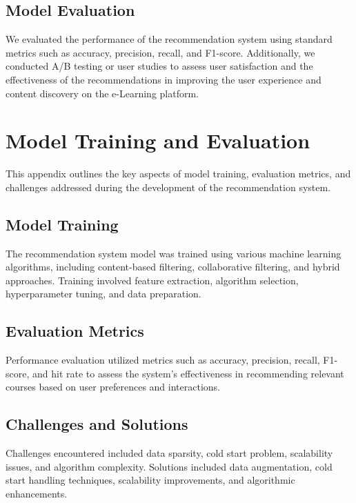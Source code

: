 \section{Model Evaluation}

We evaluated the performance of the recommendation system using standard 
metrics such as accuracy, precision, recall, and F1-score. Additionally, 
we conducted A/B testing or user studies to assess user satisfaction and 
the effectiveness of the recommendations in improving the user experience 
and content discovery on the e-Learning platform.

\chapter{Model Training and Evaluation}

This appendix outlines the key aspects of model training, evaluation metrics, and challenges addressed during the development of the recommendation system.

\section{Model Training}

The recommendation system model was trained using various machine learning algorithms, including content-based filtering, collaborative filtering, and hybrid approaches. Training involved feature extraction, algorithm selection, hyperparameter tuning, and data preparation.

\section{Evaluation Metrics}

Performance evaluation utilized metrics such as accuracy, precision, recall, F1-score, and hit rate to assess the system's effectiveness in recommending relevant courses based on user preferences and interactions.

\section{Challenges and Solutions}

Challenges encountered included data sparsity, cold start problem, scalability issues, and algorithm complexity. Solutions included data augmentation, cold start handling techniques, scalability improvements, and algorithmic enhancements.